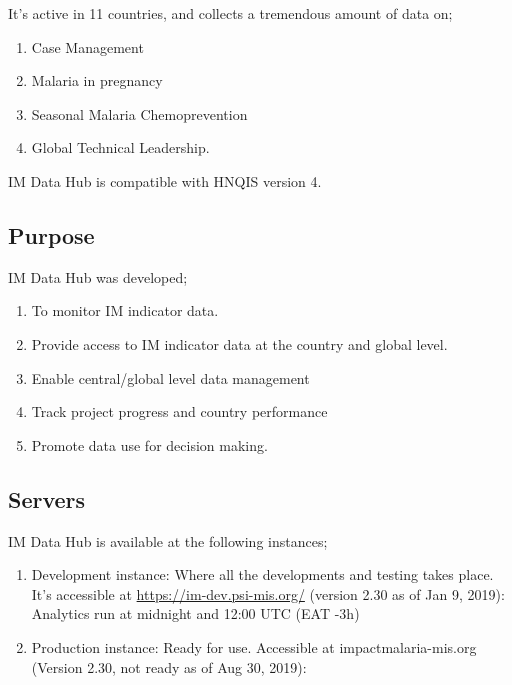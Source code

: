 \documentclass[]{book}
\providecommand{\tightlist}{%
  \setlength{\itemsep}{0pt}\setlength{\parskip}{0pt}}
\begin{document}
It's active in 11 countries, and collects a tremendous amount of data on;

\begin{enumerate}
\def\labelenumi{\arabic{enumi}.}
\tightlist
\item
  Case Management
\item
  Malaria in pregnancy
\item
  Seasonal Malaria Chemoprevention
\item
  Global Technical Leadership.
\end{enumerate}

IM Data Hub is compatible with HNQIS version 4.

\hypertarget{purpose}{%
\subsection{Purpose}\label{purpose}}

IM Data Hub was developed;

\begin{enumerate}
\def\labelenumi{\arabic{enumi}.}
\tightlist
\item
  To monitor IM indicator data.
\item
  Provide access to IM indicator data at the country and global level.
\item
  Enable central/global level data management
\item
  Track project progress and country performance
\item
  Promote data use for decision making.
\end{enumerate}

\hypertarget{servers}{%
\subsection{Servers}\label{servers}}

IM Data Hub is available at the following instances;

\begin{enumerate}
\def\labelenumi{\arabic{enumi}.}
\tightlist
\item
  Development instance: Where all the developments and testing takes place. It's accessible at \url{https://im-dev.psi-mis.org/} (version 2.30 as of Jan 9, 2019): Analytics run at midnight and 12:00 UTC (EAT -3h)
\item
  Production instance: Ready for use. Accessible at impactmalaria-mis.org (Version 2.30, not ready as of Aug 30, 2019):
\end{enumerate}
\end{document}
